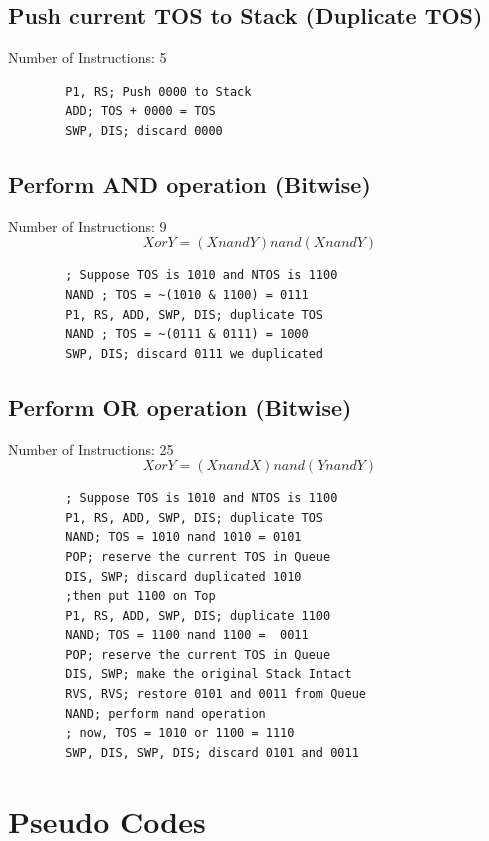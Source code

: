 \documentclass[11pt]{report}
\begin{document}
    \subsection{Push current TOS to Stack (Duplicate TOS)}
    Number of Instructions: 5
    \begin{verbatim}
        P1, RS; Push 0000 to Stack
        ADD; TOS + 0000 = TOS
        SWP, DIS; discard 0000
    \end{verbatim}

    \subsection{Perform AND operation (Bitwise)}
    Number of Instructions: 9
    $$X or Y = (XnandY)nand(XnandY)$$
    \begin{verbatim}
        ; Suppose TOS is 1010 and NTOS is 1100
        NAND ; TOS = ~(1010 & 1100) = 0111
        P1, RS, ADD, SWP, DIS; duplicate TOS 
        NAND ; TOS = ~(0111 & 0111) = 1000
        SWP, DIS; discard 0111 we duplicated
    \end{verbatim}

    \subsection{Perform OR operation (Bitwise)}
    Number of Instructions: 25
    $$XorY = (XnandX)nand(YnandY)$$
    \begin{verbatim}
        ; Suppose TOS is 1010 and NTOS is 1100
        P1, RS, ADD, SWP, DIS; duplicate TOS 
        NAND; TOS = 1010 nand 1010 = 0101
        POP; reserve the current TOS in Queue
        DIS, SWP; discard duplicated 1010
        ;then put 1100 on Top
        P1, RS, ADD, SWP, DIS; duplicate 1100
        NAND; TOS = 1100 nand 1100 =  0011
        POP; reserve the current TOS in Queue
        DIS, SWP; make the original Stack Intact
        RVS, RVS; restore 0101 and 0011 from Queue
        NAND; perform nand operation
        ; now, TOS = 1010 or 1100 = 1110
        SWP, DIS, SWP, DIS; discard 0101 and 0011
    \end{verbatim}

    \section{Pseudo Codes}
\end{document}
